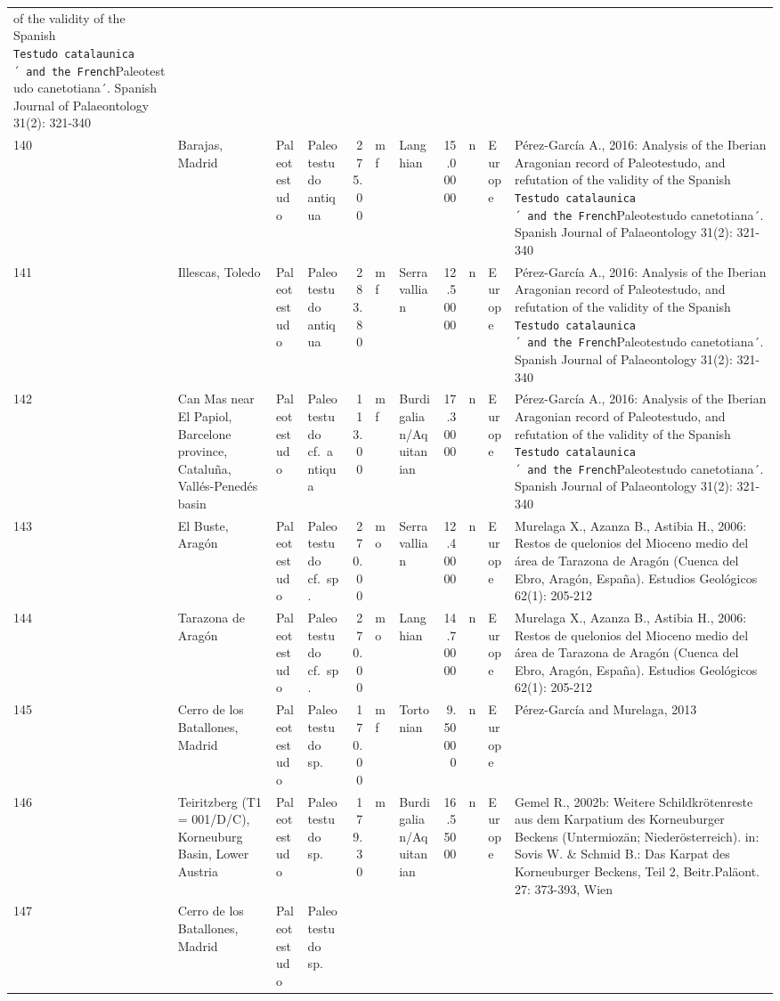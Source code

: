 \documentclass[]{article}
\begin{document}
\begin{longtable}[]{@{}llllrllrlll@{}}
of the validity of the Spanish
\texttt{Testudo\ catalaunica´\ and\ the\ French}Paleotestudo
canetotiana´. Spanish Journal of Palaeontology 31(2):
321-340\tabularnewline
140 & Barajas, Madrid & Paleotestudo & Paleotestudo antiqua & 275.00 &
mf & Langhian & 15.00000 & n & Europe & Pérez-García A., 2016: Analysis
of the Iberian Aragonian record of Paleotestudo, and refutation of the
validity of the Spanish
\texttt{Testudo\ catalaunica´\ and\ the\ French}Paleotestudo
canetotiana´. Spanish Journal of Palaeontology 31(2):
321-340\tabularnewline
141 & Illescas, Toledo & Paleotestudo & Paleotestudo antiqua & 283.80 &
mf & Serravallian & 12.50000 & n & Europe & Pérez-García A., 2016:
Analysis of the Iberian Aragonian record of Paleotestudo, and refutation
of the validity of the Spanish
\texttt{Testudo\ catalaunica´\ and\ the\ French}Paleotestudo
canetotiana´. Spanish Journal of Palaeontology 31(2):
321-340\tabularnewline
142 & Can Mas near El Papiol, Barcelone province, Cataluña,
Vallés-Penedés basin & Paleotestudo & Paleotestudo cf.~antiqua & 113.00
& mf & Burdigalian/Aquitanian & 17.30000 & n & Europe & Pérez-García A.,
2016: Analysis of the Iberian Aragonian record of Paleotestudo, and
refutation of the validity of the Spanish
\texttt{Testudo\ catalaunica´\ and\ the\ French}Paleotestudo
canetotiana´. Spanish Journal of Palaeontology 31(2):
321-340\tabularnewline
143 & El Buste, Aragón & Paleotestudo & Paleotestudo cf.~sp. & 270.00 &
mo & Serravallian & 12.40000 & n & Europe & Murelaga X., Azanza B.,
Astibia H., 2006: Restos de quelonios del Mioceno medio del área de
Tarazona de Aragón (Cuenca del Ebro, Aragón, España). Estudios
Geológicos 62(1): 205-212\tabularnewline
144 & Tarazona de Aragón & Paleotestudo & Paleotestudo cf.~sp. & 270.00
& mo & Langhian & 14.70000 & n & Europe & Murelaga X., Azanza B.,
Astibia H., 2006: Restos de quelonios del Mioceno medio del área de
Tarazona de Aragón (Cuenca del Ebro, Aragón, España). Estudios
Geológicos 62(1): 205-212\tabularnewline
145 & Cerro de los Batallones, Madrid & Paleotestudo & Paleotestudo sp.
& 170.00 & mf & Tortonian & 9.50000 & n & Europe & Pérez-García and
Murelaga, 2013\tabularnewline
146 & Teiritzberg (T1 = 001/D/C), Korneuburg Basin, Lower Austria &
Paleotestudo & Paleotestudo sp. & 179.30 & m & Burdigalian/Aquitanian &
16.55000 & n & Europe & Gemel R., 2002b: Weitere Schildkrötenreste aus
dem Karpatium des Korneuburger Beckens (Untermiozän; Niederösterreich).
in: Sovis W. \& Schmid B.: Das Karpat des Korneuburger Beckens, Teil 2,
Beitr.Paläont. 27: 373-393, Wien\tabularnewline
147 & Cerro de los Batallones, Madrid & Paleotestudo & Paleotestudo sp.

\end{longtable}
\end{document}
